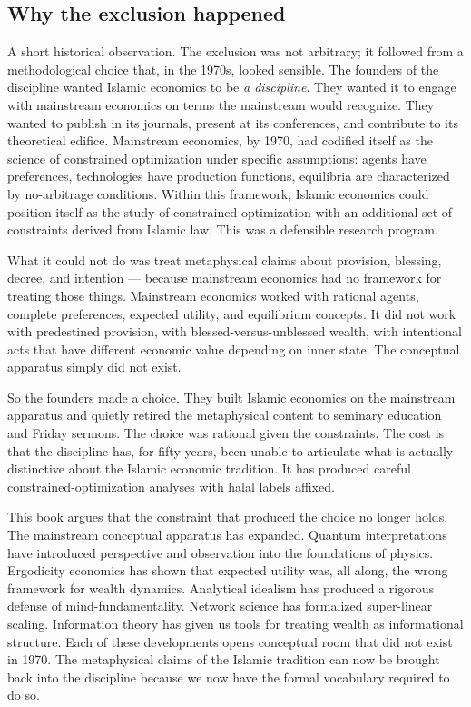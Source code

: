 \subsection{Why the exclusion happened}

A short historical observation. The exclusion was not arbitrary; it
followed from a methodological choice that, in the 1970s, looked
sensible. The founders of the discipline wanted Islamic economics to
be \emph{a discipline}. They wanted it to engage with mainstream
economics on terms the mainstream would recognize. They wanted to
publish in its journals, present at its conferences, and contribute
to its theoretical edifice. Mainstream economics, by 1970, had
codified itself as the science of constrained optimization under
specific assumptions: agents have preferences, technologies have
production functions, equilibria are characterized by no-arbitrage
conditions. Within this framework, Islamic economics could position
itself as the study of constrained optimization with an additional
set of constraints derived from Islamic law. This was a defensible
research program.

What it could not do was treat metaphysical claims about provision,
blessing, decree, and intention --- because mainstream economics
had no framework for treating those things. Mainstream economics
worked with rational agents, complete preferences, expected utility,
and equilibrium concepts. It did not work with predestined
provision, with blessed-versus-unblessed wealth, with intentional
acts that have different economic value depending on inner state.
The conceptual apparatus simply did not exist.

So the founders made a choice. They built Islamic economics on the
mainstream apparatus and quietly retired the metaphysical content to
seminary education and Friday sermons. The choice was rational
given the constraints. The cost is that the discipline has, for
fifty years, been unable to articulate what is actually distinctive
about the Islamic economic tradition. It has produced careful
constrained-optimization analyses with halal labels affixed.

This book argues that the constraint that produced the choice no
longer holds. The mainstream conceptual apparatus has expanded.
Quantum interpretations have introduced perspective and observation
into the foundations of physics. Ergodicity economics has shown that
expected utility was, all along, the wrong framework for wealth
dynamics. Analytical idealism has produced a rigorous defense of
mind-fundamentality. Network science has formalized super-linear
scaling. Information theory has given us tools for treating wealth
as informational structure. Each of these developments opens
conceptual room that did not exist in 1970. The metaphysical claims
of the Islamic tradition can now be brought back into the
discipline because we now have the formal vocabulary required to do
so.

